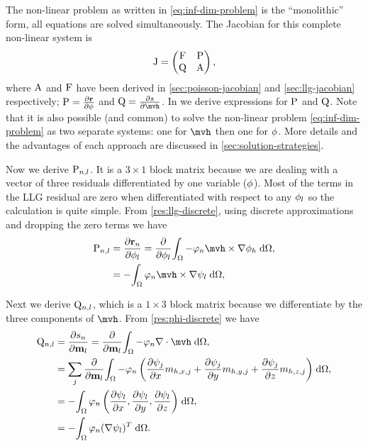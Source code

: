 {The non-linear problem as written in \cref{eq:inf-dim-problem} is the ``monolithic'' form, \ie all equations are solved simultaneously.
The Jacobian for this complete non-linear system is
\begin{equation}
  \mathrm{J} =
  \begin{pmatrix}
    \mathrm{F}   & \mathrm{P} \\
    \mathrm{Q}   & \mathrm{A} \\
  \end{pmatrix},
  \label{eq:monolithic-jac}
\end{equation}
where $\mathrm{A}$ and $\mathrm{F}$ have been derived in \cref{sec:poisson-jacobian} and \cref{sec:llg-jacobian} respectively; $\mathrm{P} = \frac{\partial \boldsymbol{\mathrm{r}}}{\partial \phi}$ and $\Qm = \pd{\rphi}{\mvh}$.
In  we derive expressions for $\mathrm{P}$ and $\mathrm{Q}$.
Note that it is also possible (and common) to solve the non-linear problem \cref{eq:inf-dim-problem} as two separate systems: one for $\mvh$ then one for $\phi$.
More details and the advantages of each approach are discussed in \cref{sec:solution-strategies}.

Now we derive $\mathrm{P}_{n,l}$.
It is a $3 \times 1$ block matrix because we are dealing with a vector of three residuals differentiated by one variable ($\phi$).
Most of the terms in the LLG residual are zero when differentiated with respect to any $\phi_{l}$ so the calculation is quite simple.
From \cref{res:llg-discrete}, using discrete approximations and dropping the zero terms we have
\begin{equation}
  \begin{aligned}
    \Pm_{n,l} &= \pd{\rllgv_n}{\phim_l}
    = \pd{}{\phim_l} \intd{ -\tbf_n \mvh \times \grad \phimh}, \\
    &= -\intd{ \tbf_n \mvh \times \grad \sbf_l}, \\
  \end{aligned}
\end{equation}

Next we derive $\mathrm{Q}_{n,l}$, which is a $1 \times 3$ block matrix because we differentiate by the three components of $\mvh$.
From \cref{res:phi-discrete} we have
\begin{equation}
  \begin{aligned}
    \Qm_{n,l} &= \pd{\rphi_n}{\mv_l} = \pd{}{\mv_l} \intd{ -\tbf_n \div \mvh}, \\
    &= \sum_j \pd{}{\mv_l} \intd{ -\tbf_n \left( \pd{\sbf_j}{x} m_{h,x,j}
        + \pd{\sbf_j}{y} m_{h,y,j} + \pd{\sbf_j}{z} m_{h,z,j} \right) }, \\
    &= -\intd{ \tbf_n \left( \pd{\sbf_l}{x},
        \pd{\sbf_l}{y}, \pd{\sbf_l}{z} \right) }, \\
    &= -\intd{\tbf_n (\grad \sbf_l)^T}.
  \end{aligned}
\end{equation}


}
